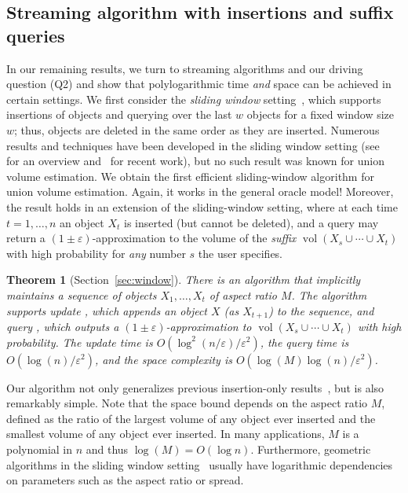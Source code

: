 \documentclass[11pt]{article}
\def\vol{\operatorname{vol}}		%
\newtheorem{theorem}{Theorem}[section]
\newcommand{\eps}{\varepsilon}
\begin{document}
\subsection{Streaming algorithm with insertions and suffix queries}
%
In our remaining results, we turn to streaming algorithms and our driving question (Q2) and show that polylogarithmic time \emph{and} space can be achieved in certain settings. 
We first consider the \emph{sliding window} setting~\cite{datar2002maintaining}, which supports insertions of objects and querying over the last $w$ objects for a fixed window size $w$;
thus, objects are deleted in the same order as they are inserted. Numerous results and techniques have been developed in the sliding window setting (see~\cite{muthukrishnan2005data,babcock2002models,Braverman16} for an overview and~\cite{woodruff2022tight,JayaramWZ22,FengSW25} for recent work), but no such result was known for union volume estimation.
%
We obtain the first efficient sliding-window algorithm for union volume estimation. Again, it
works in the general oracle model! Moreover, the result holds in an extension of the sliding-window setting, where at each time $t = 1, \dots, n$ an object $X_t$ is inserted (but cannot be deleted), and a query  may return a $(1\pm\eps)$-approximation to the volume of the \emph{suffix} $\vol(X_s \cup \cdots \cup X_t)$ with high probability for \emph{any} number $s$ the user specifies. 
%

\begin{theorem}[Section~\ref{sec:window}]
\label{thm:windowalgo}%
There is an algorithm that implicitly maintains a sequence of objects $X_1, \dots, X_t$ of aspect ratio $M$. The algorithm supports update , which appends an object $X$ (as $X_{t+1}$) to the sequence, and query , which outputs a $(1\pm\eps)$-approximation to $\vol(X_s \cup \cdots \cup X_t)$ with high probability. The update time is $O(\log^2(n/\eps)/\eps^2)$, the query time is $O(\log(n)/\eps^2)$, and the space complexity is $O(\log(M) \log(n)/\eps^2)$.
\end{theorem}

%
Our algorithm not only generalizes previous insertion-only results~\cite{MVC21}, but is also remarkably simple. Note that the space bound depends on the aspect ratio $M$, defined as the ratio of the largest volume of any object ever inserted and the smallest volume of any object ever inserted. In many applications, $M$ is a polynomial in $n$ and thus $\log(M) = O(\log n)$. Furthermore, geometric algorithms in the sliding window setting~\cite{FeigenbaumKZ04,ChanS06} usually have logarithmic dependencies on parameters such as the aspect ratio or spread.
%
\end{document}
